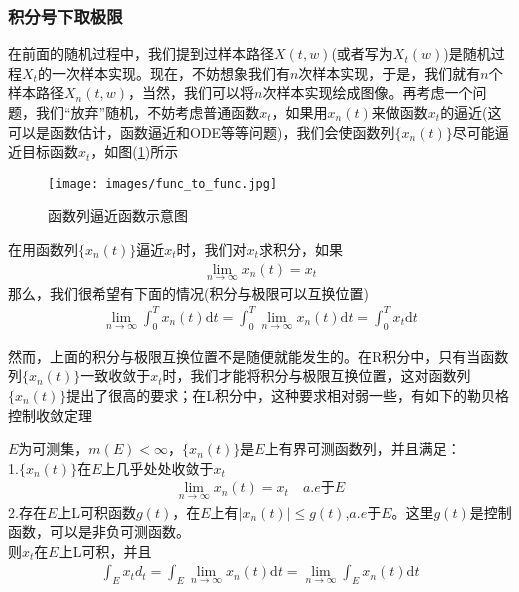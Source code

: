         \subsubsection{积分号下取极限}
            \label{subsubsec:积分号下取极限}
            \par
            在前面的随机过程中，我们提到过样本路径$X(t,w)$(或者写为$X_t(w)$)是随机过程$X_t$的一次样本实现。现在，不妨想象我们有$n$次样本实现，于是，我们就有$n$个样本路径$X_n(t,w)$，当然，我们可以将$n$次样本实现绘成图像。再考虑一个问题，我们“放弃”随机，不妨考虑普通函数$x_t$，如果用$x_n(t)$来做函数$x_t$的逼近(这可以是函数估计，函数逼近和ODE等等问题)，我们会使函数列$\{x_n(t)\}$尽可能逼近目标函数$x_t$，如图(\ref{fig:函数列逼近函数示意图})所示
            \begin{figure}[H]
                \centering
                \texttt{[image: images/func\_to\_func.jpg]}
                \caption{函数列逼近函数示意图}
                \label{fig:函数列逼近函数示意图}
            \end{figure}
            \par
            在用函数列$\{x_n(t)\}$逼近$x_t$时，我们对$x_t$求积分，如果
            \begin{align*}
                \lim_{n \rightarrow \infty} x_n(t) = x_t
            \end{align*}
            那么，我们很希望有下面的情况(积分与极限可以互换位置)
            \begin{align*}
                \lim_{n \rightarrow \infty} \int_0^T x_n(t) \mathrm{d}t = \int_0^T \lim_{n \rightarrow \infty}x_n(t) \mathrm{d}t = \int_0^T x_t \mathrm{d}t
            \end{align*}
            \par
            然而，上面的积分与极限互换位置不是随便就能发生的。在R积分中，只有当函数列$\{x_n(t)\}$一致收敛于$x_t$时，我们才能将积分与极限互换位置，这对函数列$\{x_n(t)\}$提出了很高的要求；在L积分中，这种要求相对弱一些，有如下的勒贝格控制收敛定理
            \begin{theorem}[勒贝格控制收敛定理]
            $E$为可测集，$m(E)<\infty$，$\{x_n(t)\}$是$E$上有界可测函数列，并且满足：\\
            1.$\{x_n(t)\}$在$E$上几乎处处收敛于$x_t$
            \begin{align*}
                \lim_{n \rightarrow \infty} x_n(t) = x_t \quad a.e\text{于}E
            \end{align*}
            2.存在$E$上L可积函数$g(t)$，在$E$上有$|x_n(t) |\leqslant g(t)$,$a.e$于$E$。这里$g(t)$是控制函数，可以是非负可测函数。\\
            则$x_t$在$E$上L可积，并且
            \begin{align*}
                \int_E x_td_t = \int_E \lim_{n \rightarrow \infty}x_n(t) \mathrm{d}t = \lim_{n\rightarrow \infty} \int_Ex_n(t) \mathrm{d}t
            \end{align*}
            \end{theorem}

